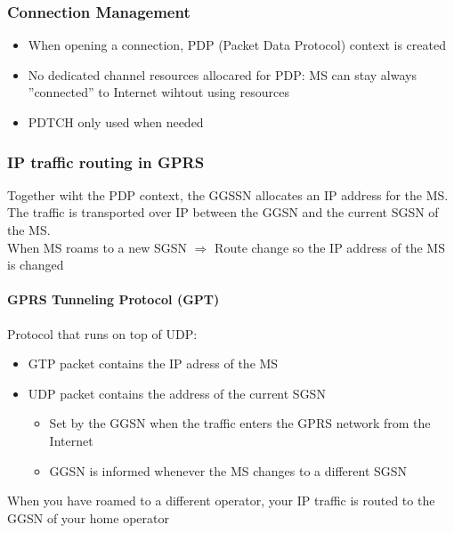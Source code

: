 \subsubsection{Connection Management}
\begin{itemize}
	\item When opening a connection, PDP (Packet Data Protocol) context is
	created
	\item No dedicated channel resources allocared for PDP: MS can stay
	always ''connected'' to Internet wihtout using resources
	\item PDTCH only used when needed
\end{itemize}

\subsubsection{IP traffic routing in GPRS}
Together wiht the PDP context, the GGSSN allocates an IP address for the MS.
The traffic is transported over IP between the GGSN and the current SGSN of
the MS.\\
When MS roams to a new SGSN $\Rightarrow$ Route change so the IP address
of the MS is changed
\paragraph{GPRS Tunneling Protocol (GPT)}
Protocol that runs on top of UDP:
\begin{itemize}
	\item GTP packet contains the IP adress of the MS
	\item UDP packet contains the address of the current SGSN
	\begin{itemize}
		\item Set by the GGSN when the traffic enters the GPRS network
		from the Internet
		\item GGSN is informed whenever the MS changes to a different
		SGSN
	\end{itemize}
\end{itemize}
When you have roamed to a different operator, your IP traffic is routed to the 
GGSN of your home operator

